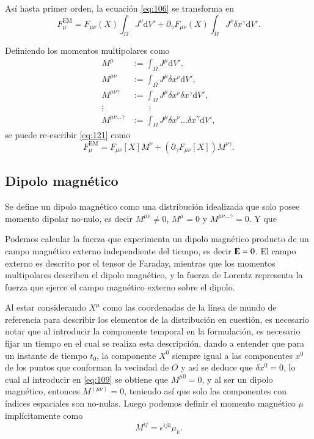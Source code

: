 Así hasta primer orden, la ecuación \eqref{eq:106} se transforma en
\begin{equation}
\label{eq:121}
F^{\mathrm{EM}}_{\mu} = F_{\mu \nu}(X) \int_{\Omega} J^{\nu} \mathrm{d}V' + \partial_{\gamma} F_{\mu \nu}(X) \int_{\Omega} J^{\nu} \delta x^{\gamma} \mathrm{d}V'.
\end{equation}

Definiendo los momentos multipolares como
\begin{align}
\label{eq:108}
M^{\mu} &:= \int_{\Omega} J^{\mu} \mathrm{d}V',\\
\label{eq:109}
M^{\mu \nu} &:= \int_{\Omega} J^{\mu} \delta x^{\nu} \mathrm{d}V',\\
M^{\mu \nu \gamma} &:= \int_{\Omega} J^{\mu} \delta x^{\nu} \delta x^{\gamma} \mathrm{d}V',\\
\vdots & \qquad \vdots \nonumber \\
M^{\mu \nu \dots \gamma} &:= \int_{\Omega} J^{\mu} \delta x^{\nu} \dots \delta x^{\gamma} \mathrm{d}V',
\end{align}
se puede re-escribir \eqref{eq:121} como
\begin{equation}
F^{\mathrm{EM}}_{\mu} = F_{\mu \nu}[X] M^{\nu} + \left( \partial_{\gamma} F_{\mu \nu}[X] \right) M^{\nu \gamma}.
\end{equation}


\subsection{Dipolo magnético}

Se define un dipolo magnético como una distribución idealizada que solo posee momento dipolar no-nulo, es decir $M^{\mu \nu} \neq 0$, $M^{\mu} = 0$ y $M^{\mu \nu \dots \gamma} = 0$. Y que 

Podemos calcular la fuerza que experimenta un dipolo magnético producto de un campo magnético externo independiente del tiempo, es decir $\vb{E}=0$. El campo externo es descrito por el tensor de Faraday, mientras que los momentos multipolares describen el dipolo magnético, y la fuerza de Lorentz representa la fuerza que ejerce el campo magnético externo sobre el dipolo.

Al estar considerando $X^{\mu}$ como las coordenadas de la línea de mundo de referencia para describir los elementos de la distribución en cuestión, es necesario notar que al introducir la componente temporal en la formulación, es necesario fijar un tiempo en el cual se realiza esta descripción, dando a entender que para un instante de tiempo $t_0$, la componente $X^0$ siempre igual a las componentes $x^0$ de los puntos que conforman la vecindad de $O$ y así se deduce que $\delta x^0 = 0$, lo cual al introducir en \eqref{eq:109} se obtiene que $M^{\mu 0} = 0$, y al ser un dipolo magnético, entonces $M^{(\mu \nu)} = 0$, teniendo así que solo las componentes con índices espaciales son no-nulas. Luego podemos definir el momento magnético $\mu$ implícitamente como
\begin{equation}
\label{eq:110}
M^{i j} = \epsilon^{i j k} \mu_k.
\end{equation}

